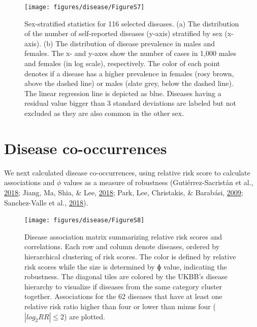 \documentclass[12pt,twoside]{unicam}
\begin{document}
\begin{figure}

{\centering \texttt{[image: figures/disease/FigureS7]} 

}

\caption[Sex-stratified statistics for the 116 diseases.]{Sex-stratified statistics for 116 selected diseases. (a) The distribution of the number of self-reported diseases (y-axis) stratified by sex (x-axis). (b) The distribution of disease prevalence in males and females. The x- and y-axes show the number of cases in 1,000 males and females (in log scale), respectively. The color of each point denotes if a disease has a higher prevalence in females (rosy brown, above the dashed line) or males (slate grey, below the dashed line). The linear regression line is depicted as blue. Diseases having a residual value bigger than 3 standard deviations are labeled but not excluded as they are also common in the other sex.}\label{fig:disFigS7}
\end{figure}

\hypertarget{disease-co-occurrences}{%
\section{Disease co-occurrences}\label{disease-co-occurrences}}

We next calculated disease co-occurrences, using relative risk score to calculate associations and \(\phi\) values as a measure of robustness (Gutiérrez-Sacristán et al., \protect\hyperlink{ref-Gutierrez-Sacristan2018}{2018}; Jiang, Ma, Shia, \& Lee, \protect\hyperlink{ref-Jiang2018}{2018}; Park, Lee, Christakis, \& Barabási, \protect\hyperlink{ref-Park2009}{2009}; Sanchez-Valle et al., \protect\hyperlink{ref-Sanchez-Valle2018}{2018}).

\begin{figure}

{\centering \texttt{[image: figures/disease/FigureS8]} 

}

\caption[Disease association matrix summarizing relative risk scores and correlations.]{Disease association matrix summarizing relative risk scores and correlations. Each row and column denote diseases, ordered by hierarchical clustering of risk scores. The color is defined by relative risk scores while the size is determined by ɸ value, indicating the robustness. The diagonal tiles are colored by the UKBB's disease hierarchy to visualize if diseases from the same category cluster together. Associations for the 62 diseases that have at least one relative risk ratio higher than four or lower than minus four ($|log_2RR| ≤ 2$) are plotted.}\label{fig:disFigS8}
\end{figure}
\end{document}
